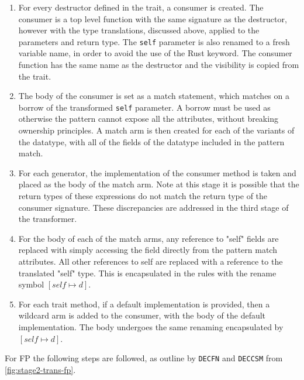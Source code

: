 \documentclass[ oneside,%
                    author={James Elgar},
                    degree={MEng},
                     title={Bidirectional transformer between functional and \\ object-oriented programming in Rust},
                  subtitle={}]{dissertation}
\begin{document}
\begin{enumerate}
    \item For every destructor defined in the trait, a consumer is created. The consumer is a top level function with the same signature as the destructor, however with the type translations, discussed above, applied to the parameters and return type. The \verb|self| parameter is also renamed to a fresh variable name, in order to avoid the use of the Rust keyword. The consumer function has the same name as the destructor and the visibility is copied from the trait.
    \item The body of the consumer is set as a match statement, which matches on a borrow of the transformed \verb|self| parameter. A borrow must be used as otherwise the pattern cannot expose all the attributes, without breaking ownership principles. A match arm is then created for each of the variants of the datatype, with all of the fields of the datatype included in the pattern match.
    \item For each generator, the implementation of the consumer method is taken and placed as the body of the match arm. Note at this stage it is possible that the return types of these expressions do not match the return type of the consumer signature. These discrepancies are addressed in the third stage of the transformer.
    \item For the body of each of the match arms, any reference to "self" fields are replaced with simply accessing the field directly from the pattern match attributes. All other references to self are replaced with a reference to the translated "self" type. This is encapsulated in the rules with the rename symbol $[self \mapsto d]$. 
    \item For each trait method, if a default implementation is provided, then a wildcard arm is added to the consumer, with the body of the default implementation. The body undergoes the same renaming encapsulated by $[self \mapsto d]$.
\end{enumerate}

For FP  the following steps are followed, as outline by \verb|DECFN| and \verb|DECCSM| from \autoref{fig:stage2-trans-fp}.
\end{document}
